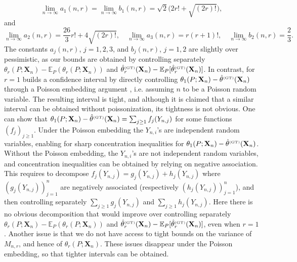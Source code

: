 \documentclass{article}
\newcommand{\1}{\boldsymbol{1}}
\newcommand{\EE}{\mathbb{E}}
\theoremstyle{plain}
\begin{document}
\begin{equation*}
  \lim_{n\to \infty}a_1(n,r)%
  =\lim_{n\to \infty}b_1(n,r)%
  = \sqrt{2}\Big(2r! + \sqrt{(2r)!}\Big),
\end{equation*}
and
\begin{equation*}
  \lim_{n\to \infty}a_2(n,r)%
  = \frac{26}{3}r! + 4\sqrt{(2r)!},\quad%
  \lim_{n\to \infty}a_3(n,r)%
  = r (r+1)!,\quad%
  \lim_{n\to \infty}b_2(n,r)%
  =\frac{2}{3}.
\end{equation*}
The constants $a_j(n,r)$, $j=1,2,3$, and $b_j(n,r)$, $j=1,2$ are slightly over pessimistic, as our bounds are obtained by controlling separately $\theta_r(P;\mathbf{X}_n) - \EE_P(\theta_r(P;\mathbf{X}_n))$ and $\hat{\theta}_{r}^{\text{\tiny{(GT)}}}(\mathbf{X}_{n}) - \EE_P[\hat{\theta}_{r}^{\text{\tiny{(GT)}}}(\mathbf{X}_{n})]$. In contrast, for $r=1$ \cite[Proposition 5.5.]{Ben(17)} builds a confidence interval by directly controlling  $\theta_1(P;\mathbf{X}_n) - \hat{\theta}^{\text{\tiny{(GT)}}}(\mathbf{X}_{n})$ through a Poisson embedding argument \cite{Gne(07)}, i.e. assuming $n$ to be a Poisson random variable. The resulting interval is tight, and although it is claimed that a similar interval can be obtained without poissonization, its tightness is not obvious. One can show that $\theta_1(P;\mathbf{X}_n) - \hat{\theta}^{\text{\tiny{(GT)}}}(\mathbf{X}_{n}) = \sum_{j\geq 1}f_j(Y_{n,j})$ for some functions $(f_j)_{j\geq 1}$. Under the Poisson embedding the $Y_{n,i}$'s are independent random variables,  enabling for sharp concentration inequalities for $\theta_1(P;\mathbf{X}_n) -  \hat{\theta}^{\text{\tiny{(GT)}}}(\mathbf{X}_{n})$. Without the Poisson embedding, the $Y_{n,i}$'s are not independent random variables, and concentration inequalities can be obtained by relying on negative association. This requires to  decompose $f_j(Y_{n,j}) = g_j(Y_{n,j}) + h_j(Y_{n,j})$ where $(g_j(Y_{n,j}))_{j=1}^{n}$  are negatively associated (respectively $(h_j(Y_{n,j}))_{j=1}^n$), and then controlling separately $\sum_{j\geq 1}g_j(Y_{n,j})$ and $\sum_{j\geq 1}h_j(Y_{n,j})$.  Here there is no obvious decomposition that would improve over controlling separately $\theta_r(P;\mathbf{X}_n) - \EE_P(\theta_r(P;\mathbf{X}_n))$ and $\hat{\theta}_{r}^{\text{\tiny{(GT)}}}(\mathbf{X}_{n}) - \EE_P[\hat{\theta}_{r}^{\text{\tiny{(GT)}}}(\mathbf{X}_{n})]$, even when $r=1$. Another issue is that we do not have access to tight bounds on the variance of $M_{n,r}$, and hence of $\theta_r(P;\mathbf{X}_n)$. These issues disappear under the Poisson embedding, so that tighter intervals can be obtained.
\end{document}
